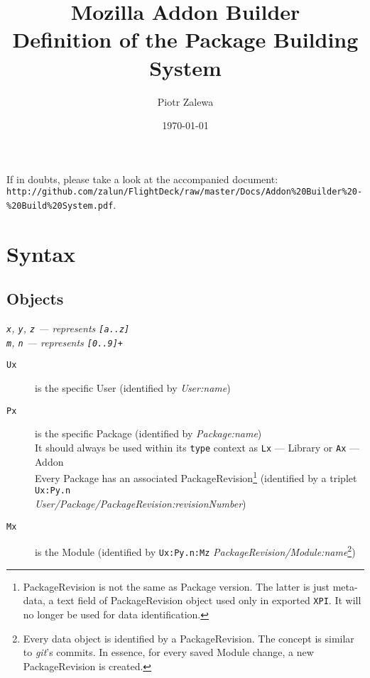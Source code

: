 \documentclass[10pt]{article}
\title{Mozilla Addon Builder\\ Definition of the Package Building System}
\author{Piotr Zalewa}
\date{\today}
\def\xpi{{\tt XPI}}
\begin{document}
\maketitle


\noindent If in doubts, please take a look at the accompanied document:\\ {\tt http://github.com/zalun/FlightDeck/raw/master/Docs/Addon\%20Builder\%20-\%20Build\%20System.pdf}.

\section{Syntax}

	\subsection{Objects}
	
	{\em \small {\tt x}, {\tt y}, {\tt z} --- represents {\tt [a..z]}\\
	{\tt m}, {\tt n} --- represents {\tt [0..9]+}}
	
	\begin{description}
		\item[{\tt Ux}] is the specific User (identified by {\em User:name})
		\item[{\tt Px}] is the specific Package (identified by {\em Package:name})\\
			It should always be used within its {\tt type} context as {\tt Lx} --- Library or {\tt Ax} --- Addon\\
			Every Package has an associated PackageRevision\footnote{PackageRevision is not the same as Package version. The latter is just meta-data, a text field of PackageRevision object used only in exported \xpi. It will no longer be used for data identification.} (identified by a triplet {\tt Ux:Py.n} \\{\em User/Package/PackageRevision:revisionNumber})
		\item[{\tt Mx}] is the Module (identified by {\tt Ux:Py.n:Mz} {\em PackageRevision/Module:name}\footnote{Every data object is identified by a PackageRevision. The concept is similar to {\em git}'s commits. In essence, for every saved Module change, a new PackageRevision is created.})
	\end{description}
\end{document}
